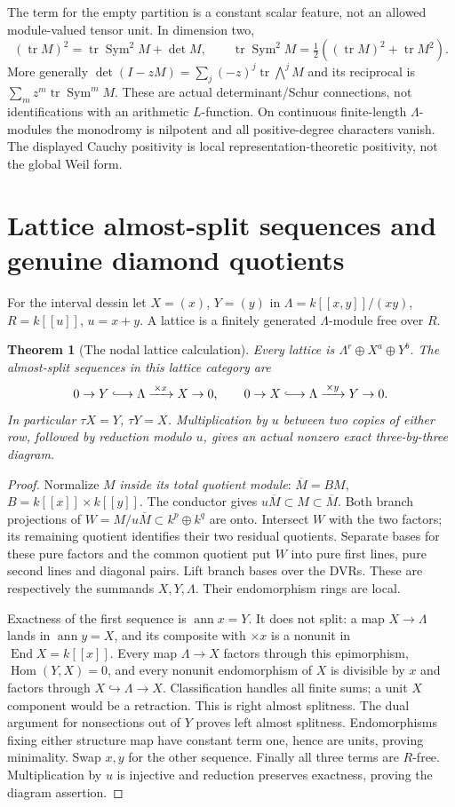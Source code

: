 \documentclass[11pt]{article}
\newtheorem{theorem}{Theorem}[section]
\theoremstyle{definition}\newtheorem{definition}[theorem]{Definition}
\theoremstyle{remark}\newtheorem{remark}[theorem]{Remark}
\DeclareMathOperator{\tr}{tr}\DeclareMathOperator{\Rea}{Re}
\begin{document}
The term for the empty partition is a constant scalar feature, not an allowed module-valued tensor unit. In dimension two,
\[
 (\tr M)^2=\tr\operatorname{Sym}^2M+\det M,\qquad
 \tr\operatorname{Sym}^2M=\tfrac12((\tr M)^2+\tr M^2).
\]
More generally $\det(I-zM)=\sum_j(-z)^j\tr\bigwedge^jM$ and its reciprocal is $\sum_m z^m\tr\operatorname{Sym}^mM$. These are actual determinant/Schur connections, not identifications with an arithmetic $L$-function. On continuous finite-length $\Lambda$-modules the monodromy is nilpotent and all positive-degree characters vanish. The displayed Cauchy positivity is local representation-theoretic positivity, not the global Weil form.

\section{Lattice almost-split sequences and genuine diamond quotients}
For the interval dessin let $X=(x)$, $Y=(y)$ in $\Lambda=k[[x,y]]/(xy)$, $R=k[[u]]$, $u=x+y$. A lattice is a finitely generated $\Lambda$-module free over $R$.
\begin{theorem}[The nodal lattice calculation]\label{thm:nodear}
Every lattice is $\Lambda^r\oplus X^a\oplus Y^b$. The almost-split sequences in this lattice category are
\[
 0\to Y\lhook\joinrel\longrightarrow\Lambda\xrightarrow{\,\times x\,}X\to0,
 \qquad0\to X\lhook\joinrel\longrightarrow\Lambda\xrightarrow{\,\times y\,}Y\to0.
\]
In particular $\tau X=Y$, $\tau Y=X$. Multiplication by $u$ between two copies of either row, followed by reduction modulo $u$, gives an actual nonzero exact three-by-three diagram.
\end{theorem}
\begin{proof}
Normalize $M$ \emph{inside its total quotient module}: $\overline M=BM$, $B=k[[x]]\times k[[y]]$. The conductor gives $u\overline M\subset M\subset\overline M$. Both branch projections of $W=M/u\overline M\subset k^p\oplus k^q$ are onto. Intersect $W$ with the two factors; its remaining quotient identifies their two residual quotients. Separate bases for these pure factors and the common quotient put $W$ into pure first lines, pure second lines and diagonal pairs. Lift branch bases over the DVRs. These are respectively the summands $X,Y,\Lambda$. Their endomorphism rings are local.

Exactness of the first sequence is $\operatorname{ann}x=Y$. It does not split: a map $X\to\Lambda$ lands in $\operatorname{ann}y=X$, and its composite with $\times x$ is a nonunit in $\operatorname{End}X=k[[x]]$. Every map $\Lambda\to X$ factors through this epimorphism, $\operatorname{Hom}(Y,X)=0$, and every nonunit endomorphism of $X$ is divisible by $x$ and factors through $X\hookrightarrow\Lambda\to X$. Classification handles all finite sums; a unit $X$ component would be a retraction. This is right almost splitness. The dual argument for nonsections out of $Y$ proves left almost splitness. Endomorphisms fixing either structure map have constant term one, hence are units, proving minimality. Swap $x,y$ for the other sequence. Finally all three terms are $R$-free. Multiplication by $u$ is injective and reduction preserves exactness, proving the diagram assertion.
\end{proof}
\end{document}
